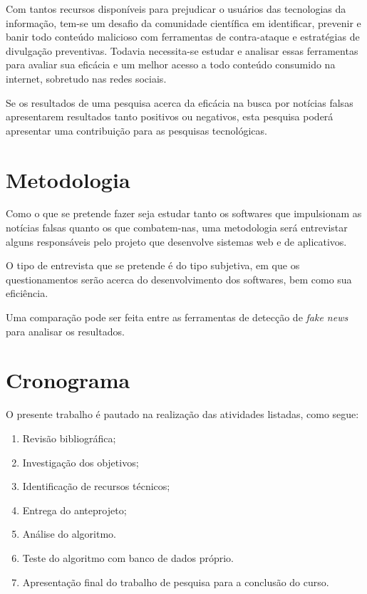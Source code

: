 Com tantos recursos disponíveis para prejudicar o usuários das tecnologias da informação, tem-se um desafio da comunidade científica em identificar, prevenir e banir todo conteúdo malicioso com ferramentas de contra-ataque e estratégias de divulgação preventivas. Todavia necessita-se estudar e analisar essas ferramentas para avaliar sua eficácia e um melhor acesso a todo conteúdo consumido na internet, sobretudo nas redes sociais.

Se os resultados de uma pesquisa acerca da eficácia na busca por notícias falsas apresentarem resultados tanto positivos ou negativos, esta pesquisa poderá apresentar uma contribuição para as pesquisas tecnológicas.


\chapter {Metodologia}

Como o que se pretende fazer seja estudar tanto os softwares que impulsionam as notícias falsas quanto os que combatem-nas, uma metodologia será entrevistar alguns responsáveis pelo projeto que desenvolve sistemas web e de aplicativos.

O tipo de entrevista que se pretende é do tipo subjetiva, em que os questionamentos serão acerca do desenvolvimento dos softwares, bem como sua eficiência.

Uma comparação pode ser feita entre as ferramentas de detecção de \textit{fake news} para analisar os resultados.


\chapter{Cronograma}

O presente trabalho é pautado na realização das atividades listadas, como segue:

\begin{enumerate}
	\item Revisão bibliográfica;
	\item Investigação dos objetivos;
	\item Identificação de recursos técnicos;
	\item Entrega do anteprojeto; 
	\item Análise do algoritmo.
	\item Teste do algoritmo com banco de dados próprio.
	\item Apresentação final do trabalho de pesquisa para a conclusão do curso.
	
\end{enumerate}

